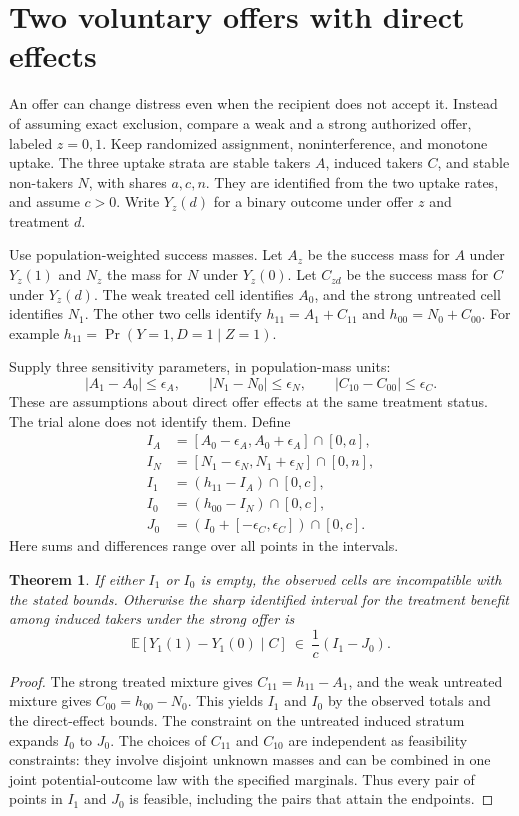 \documentclass[11pt]{article}
\newtheorem{theorem}{Theorem}
\begin{document}
\section{Two voluntary offers with direct effects}
An offer can change distress even when the recipient does not
accept it. Instead of assuming exact exclusion, compare a weak
and a strong authorized offer, labeled $z=0,1$. Keep randomized
assignment, noninterference, and monotone uptake. The three
uptake strata are stable takers $A$, induced takers $C$, and
stable non-takers $N$, with shares $a,c,n$. They are identified
from the two uptake rates, and assume $c>0$. Write $Y_z(d)$
for a binary outcome under offer $z$ and treatment $d$.

Use population-weighted success masses. Let $A_z$ be the
success mass for $A$ under $Y_z(1)$ and $N_z$ the mass for $N$
under $Y_z(0)$. Let $C_{zd}$ be the success mass for $C$ under
$Y_z(d)$. The weak treated cell identifies $A_0$, and the
strong untreated cell identifies $N_1$. The other two cells
identify $h_{11}=A_1+C_{11}$ and $h_{00}=N_0+C_{00}$.
For example $h_{11}=\Pr(Y=1,D=1\mid Z=1)$.

Supply three sensitivity parameters, in population-mass units:
\[
 |A_1-A_0|\le \epsilon_A,\qquad
 |N_1-N_0|\le \epsilon_N,\qquad
 |C_{10}-C_{00}|\le \epsilon_C.
\]
These are assumptions about direct offer effects at the same
treatment status. The trial alone does not identify them.
Define
\begin{align*}
 I_A &= [A_0-\epsilon_A,A_0+\epsilon_A]\cap[0,a],\\
 I_N &= [N_1-\epsilon_N,N_1+\epsilon_N]\cap[0,n],\\
 I_1 &= (h_{11}-I_A)\cap[0,c],\\
 I_0 &= (h_{00}-I_N)\cap[0,c],\\
 J_0 &= (I_0+[-\epsilon_C,\epsilon_C])\cap[0,c].
\end{align*}
Here sums and differences range over all points in the intervals.

\begin{theorem}
If either $I_1$ or $I_0$ is empty, the observed cells are
incompatible with the stated bounds. Otherwise the sharp
identified interval for the treatment benefit among induced
takers under the strong offer is
\[
 \mathbb E[Y_1(1)-Y_1(0)\mid C]
 \ \in\ \frac{1}{c}(I_1-J_0).
\]
\end{theorem}
\begin{proof}
The strong treated mixture gives $C_{11}=h_{11}-A_1$,
and the weak untreated mixture gives $C_{00}=h_{00}-N_0$.
This yields $I_1$ and $I_0$ by the observed totals and the
direct-effect bounds. The constraint on the untreated induced
stratum expands $I_0$ to $J_0$. The choices of $C_{11}$
and $C_{10}$ are independent as feasibility constraints:
they involve disjoint unknown masses and can be combined
in one joint potential-outcome law with the specified
marginals. Thus every pair of points in $I_1$ and $J_0$
is feasible, including the pairs that attain the endpoints.
\end{proof}
\end{document}
